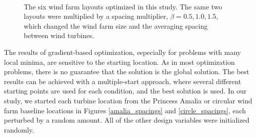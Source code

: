 \begin{figure}[htbp]
  \centering
  \\
  \caption{\label{farm_spacings}The six wind farm layouts optimized in this study. The same two layouts were multiplied by a spacing multiplier, $\beta=0.5,1.0,1.5$, which changed the wind farm size and the averaging spacing between wind turbines. }
\end{figure}

The results of gradient-based optimization, especially for problems with many local minima, are sensitive to the starting location. As in most optimization problems, there is no guarantee that the solution is the global solution. The best results can be achieved with a multiple-start approach, where several different starting points are used for each condition, and the best solution is used. In our study, we started each turbine location from the Princess Amalia or circular wind farm baseline locations in Figures \ref{amalia_spacings} and \ref{circle_spacings}, each perturbed by a random amount. All of the other design variables were initialized randomly.

